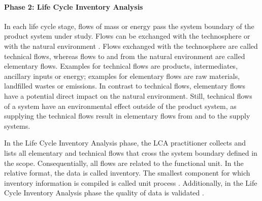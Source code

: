 \paragraph{Phase 2: Life Cycle Inventory Analysis} In each life cycle stage, flows of mass or energy pass the system boundary of the product system under study. Flows can be exchanged with the technosphere or with the natural environment \cite{InternationalOrganizationforStandardization.2006}. Flows exchanged with the technosphere are called technical flows, whereas flows to and from the natural environment are called elementary flows. Examples for technical flows are products, intermediates, ancillary inputs or energy; examples for elementary flows are raw materials, landfilled wastes or emissions. In contrast to technical flows, elementary flows have a potential direct impact on the natural environment. Still, technical flows of a system have an environmental effect outside of the product system, as supplying the technical flows result in elementary flows from and to the supply systems.%

In the Life Cycle Inventory Analysis phase, the \ac{LCA} practitioner collects and lists all elementary and  technical flows that cross the system boundary defined in the scope. Consequentially, all flows are related to the functional unit. In the relative format, the data is called inventory. The smallest component for which inventory information is compiled is called unit process \cite{InternationalOrganizationforStandardization.2006b}. Additionally, in the Life Cycle Inventory Analysis phase the quality of data is validated \cite{InternationalOrganizationforStandardization.2006}.

